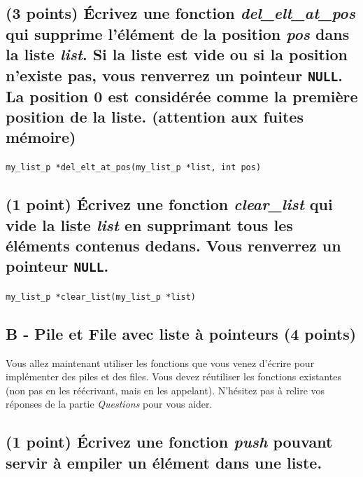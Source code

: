 \documentclass[11pt,a4paper]{article}
\begin{document}
\subsection{(3 points) \'Ecrivez une fonction \og \textit{del\_elt\_at\_pos} \fg{} qui supprime l'élément de la position \textit{pos} dans la liste \textit{list}. Si la liste est vide ou si la position n'existe pas, vous renverrez un pointeur \texttt{NULL}. La position 0 est considérée comme la première position de la liste. (attention aux fuites mémoire) }

\bigskip

\texttt{my\_list\_p *del\_elt\_at\_pos(my\_list\_p *list, int pos)}

\begin{center}
\end{center}

\newpage

\subsection{(1 point) \'Ecrivez une fonction \og \textit{clear\_list} \fg{} qui vide la liste \textit{list} en supprimant tous les éléments contenus dedans. Vous renverrez un pointeur \texttt{NULL}. }

\bigskip

\texttt{my\_list\_p *clear\_list(my\_list\_p *list)}

\begin{center}
\end{center}




\subsection*{B - Pile et File avec liste à pointeurs (4 points)}

Vous allez maintenant utiliser les fonctions que vous venez d'écrire pour implémenter des piles et des files.
Vous devez réutiliser les fonctions existantes (non pas en les réécrivant, mais en les appelant).
N'hésitez pas à relire vos réponses de la partie \textit{Questions} pour vous aider.

\subsection{(1 point) \'Ecrivez une fonction \og \textit{push} \fg{} pouvant servir à empiler un élément dans une liste. }
\end{document}
